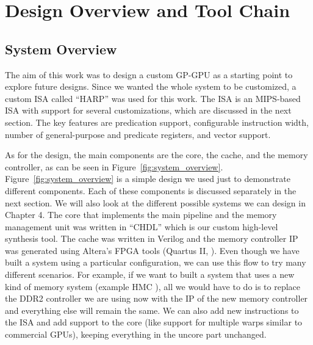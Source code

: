\setcounter{equation}{0}

\chapter{Design Overview and Tool Chain}
\label{chap: Design Overview and Tool Chain}

\section{ System Overview }
The aim of this work was to design a custom GP-GPU as a starting point to explore future designs. Since we wanted the whole system to be customized, a custom ISA %
called ``HARP'' was used for this work. The ISA is an MIPS-based ISA with support for several customizations, which are discussed in the next section. The key features are predication support, configurable instruction width, number of general-purpose and predicate registers, and vector support. 

As for the design, the main components are the core, the cache, and the memory controller, as can be seen in Figure~\ref{fig:system_overview}. Figure~\ref{fig:system_overview} is a simple design we used just to demonstrate different components. Each of these components is discussed separately in the next section. We will also look at the different possible systems we can design in Chapter 4. The core that implements the main pipeline and the memory management unit was written in ``CHDL'' which is our custom high-level synthesis tool.%
The cache was written in Verilog and the memory controller IP was generated using Altera's FPGA tools (Quartus II, \cite{quartus}). Even though we have built a system using a particular configuration, we can use this flow to try many different scenarios. For example, if we want to built a system that uses a new kind of memory system (example HMC \cite{hmc}), all we would have to do is to replace the DDR2 controller we are using now with the IP of the new memory controller and everything else will remain the same. We can also add new instructions to the ISA and add support to the core (like support for multiple warps similar to commercial GPUs), keeping everything in the uncore part unchanged. 
\\

